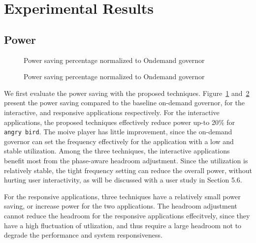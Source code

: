 \section{Experimental Results}



\subsection{Power}

\begin{figure}[bt]
\begin{center}
\end{center}
\caption{Power saving percentage normalized to Ondemand governor}
\label{fig:interactive_power_result}
\end{figure}

\begin{figure}[bt]
\begin{center}
\end{center}
\caption{Power saving percentage normalized to Ondemand governor}
\label{fig:responsive_power}
\end{figure}

We first evaluate the power saving with the proposed techniques. Figure~\ref{fig:interactive_power_result} and~\ref{fig:responsive_power} 
present the power saving compared to the baseline on-demand governor, for the interactive, and responsive applications respectively. 
For the interactive applications, the proposed techniques effectively reduce power up-to 20\% for {\tt angry bird}. 
The moive player has little improvement, since the on-demand governor can set the frequency effectively for the application with
a low and stable utilization. Among the three techniques, the interactive applications benefit most from the phase-aware headroom
adjustment. Since the utilization is relatively stable, the tight frequency setting can reduce the overall power, without
hurting user interactivity, as will be discussed with a user study in Section 5.6. 

For the responsive applications, three techniques have a relatively small power saving, or increase power for the two applications.
The headroom adjustment cannot reduce the headroom for the responsive applications effecitvely, since they have a high fluctuation of 
utlization, and thus require a large headroom not to degrade the performance and system responsiveness. 


